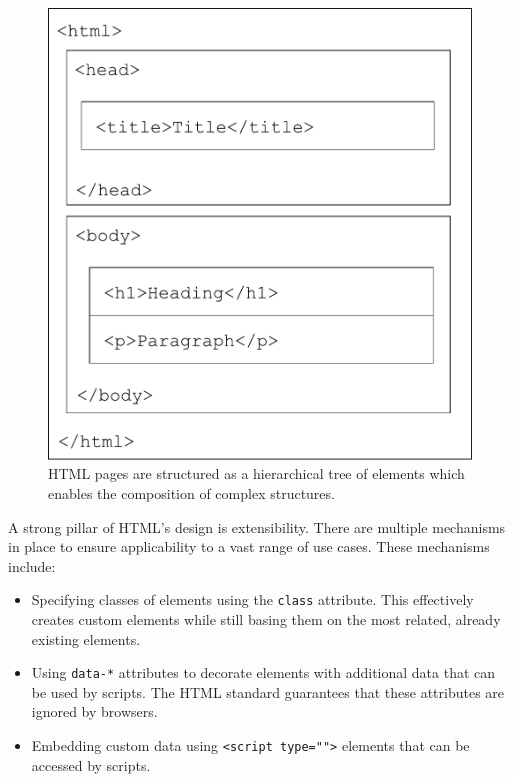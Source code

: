 \begin{figure}[tp]
    \centering
    \includegraphics[keepaspectratio,width=\linewidth,height=\halfh]
    {diagrams/html-structure.pdf}

    \caption[Structure of HTML pages]{
        HTML pages are structured as a hierarchical tree of elements which enables the composition of complex structures.
    }
    \label{fig:HTMLStructure}
\end{figure}

A strong pillar of HTML's design is extensibility. There are multiple mechanisms in place to ensure applicability to a vast range of use cases. These mechanisms include:

\begin{itemize}
    \item Specifying classes of elements using the \lstinline{class} attribute. This effectively creates custom elements while still basing them on the most related, already existing elements.
    \item Using \lstinline{data-*} attributes to decorate elements with additional data that can be used by scripts. The HTML standard guarantees that these attributes are ignored by browsers.
    \item Embedding custom data using \lstinline{<script type="">} elements that can be accessed by scripts.
\end{itemize}


